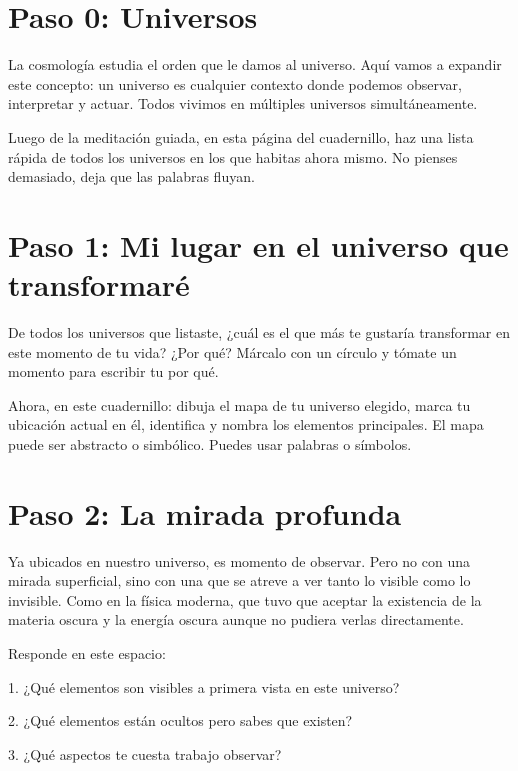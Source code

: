 \documentclass[statementpaper,oneside,article,10pt]{memoir}
\begin{document}


\section{Paso 0: Universos}

La cosmología estudia el orden que le damos al universo. Aquí vamos a expandir este concepto: un universo es cualquier contexto donde podemos observar, interpretar y actuar. Todos vivimos en múltiples universos simultáneamente.

Luego de la meditación guiada, en esta página del cuadernillo, haz una lista rápida de todos los universos en los que habitas ahora mismo. No pienses demasiado, deja que las palabras fluyan.

\newpage
\section{Paso 1: Mi lugar en el universo que transformaré}


De todos los universos que listaste, ¿cuál es el que más te gustaría transformar en este momento de tu vida? ¿Por qué?
Márcalo con un círculo y tómate un momento para escribir tu por qué.

Ahora, en este cuadernillo: dibuja el mapa de tu universo elegido, marca tu ubicación actual en él, identifica y nombra los elementos principales. El mapa puede ser abstracto o simbólico. Puedes usar palabras o símbolos. 

\newpage
\section{Paso 2: La mirada profunda}

Ya ubicados en nuestro universo, es momento de observar. Pero no con una mirada superficial, sino con una que se atreve a ver tanto lo visible como lo invisible. Como en la física moderna, que tuvo que aceptar la existencia de la materia oscura y la energía oscura aunque no pudiera verlas directamente.

Responde en este espacio:

1. ¿Qué elementos son visibles a primera vista en este universo?
\vspace{4cm}

2. ¿Qué elementos están ocultos pero sabes que existen?
\vspace{4cm}

3. ¿Qué aspectos te cuesta trabajo observar?
\vspace{4cm}
\end{document}
